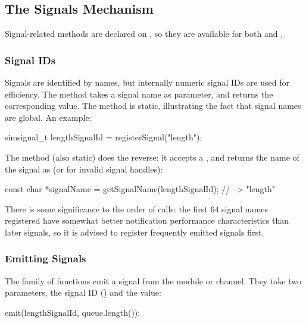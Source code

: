 \subsection{The Signals Mechanism}
\label{sec:simple-modules:signals-api}

Signal-related methods are declared on , so they are available
for both  and .

\subsubsection{Signal IDs}

Signals are identified by names, but internally numeric signal IDs are used
for efficiency. The  method takes a signal name as
parameter, and returns the corresponding  value.
The method is static, illustrating the fact that signal names are global.
An example:

\begin{cpp}
simsignal_t lengthSignalId = registerSignal("length");
\end{cpp}

The  method (also static) does the reverse:
it accepts a , and returns the name of the signal as
 (or  for invalid signal handles):

\begin{cpp}
const char *signalName = getSignalName(lengthSignalId); // --> "length"
\end{cpp}

\begin{note}
  There is some significance to the order of  calls: the
  first 64 signal names registered have somewhat better notification
  performance characteristics than later signals, so it is advised to
  register frequently emitted signals first.
\end{note}

\subsubsection{Emitting Signals}

The  family of functions emit a signal from the module or
channel. They take two parameters, the signal ID () and
the value:

\begin{cpp}
emit(lengthSignalId, queue.length());
\end{cpp}

